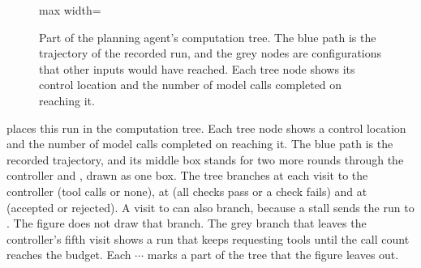 \begin{figure}[t]
\begin{adjustbox}{max width=\linewidth}
  \end{adjustbox}
  \caption{Part of the planning agent's computation tree. The blue path is the trajectory of the
  recorded run, and the grey nodes are configurations that other inputs would have reached. Each
  tree node shows its control location and the number of model calls completed on reaching it.}
  \label{fig:machines-tree}
\end{figure}

 places this run in the computation tree. Each tree node shows a control
location and the number of model calls completed on reaching it. The blue path is the recorded
trajectory, and its middle box stands for two more rounds through the controller and ,
drawn as one box. The tree branches at each visit to the controller (tool calls or none), at
 (all checks pass or a check fails) and at  (accepted or
rejected). A visit to  can also branch, because a stall sends the run to
. The figure does not draw that branch. The grey branch that leaves the controller's
fifth visit shows a run that keeps requesting tools until the call count reaches the budget. Each
$\cdots$ marks a part of the tree that the figure leaves out.

